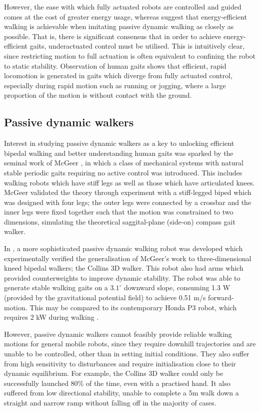 However, the ease with which fully actuated robots are controlled and guided comes at the cost of greater energy usage, whereas \cite{mcgeer1990passive, asano2007dynamic, byl2008approximate} suggest that energy-efficient walking is achievable when imitating passive dynamic walking as closely as possible. That is, there is significant consensus that in order to achieve energy-efficient gaits, underactuated control must be utilised. This is intuitively clear, since restricting motion to full actuation is often equivalent to confining the robot to static stability. Observation of human gaits shows that efficient, rapid locomotion is generated in gaits which diverge from fully actuated control, especially during rapid motion such as running or jogging, where a large proportion of the motion is without contact with the ground.

\subsection{Passive dynamic walkers}
Interest in studying passive dynamic walkers as a key to unlocking efficient bipedal walking and better understanding human gaits was sparked by the seminal work of McGeer \cite{mcgeer1990passive}, in which a class of mechanical systems with natural stable periodic gaits requiring no active control was introduced. This includes walking robots which have stiff legs as well as those which have articulated knees. McGeer validated the theory through experiment with a stiff-legged biped which was designed with four legs; the outer legs were connected by a crossbar and the inner legs were fixed together such that the motion was constrained to two dimensions, simulating the theoretical saggital-plane (side-on) compass gait walker.

In \cite{collins2001three}, a more sophisticated passive dynamic walking robot was developed which experimentally verified the generalisation of McGeer's work to three-dimensional kneed bipedal walkers; the Collins 3D walker. This robot also had arms which provided counterweights to improve dynamic stability. The robot was able to generate stable walking gaits on a $3.1^{\circ}$ downward slope, consuming 1.3 W (provided by the gravitational potential field) to achieve 0.51 m/s forward-motion. This may be compared to its contemporary Honda P3 robot, which requires 2 kW during walking \cite{collins2001three}.

However, passive dynamic walkers cannot feasibly provide reliable walking motions for general mobile robots, since they require downhill trajectories and are unable to be controlled, other than in setting initial conditions. They also suffer from high sensitivity to disturbances and require initialisation close to their dynamic equilibrium. For example, the Collins 3D walker could only be successfully launched 80\% of the time, even with a practised hand. It also suffered from low directional stability, unable to complete a 5m walk down a straight and narrow ramp without falling off in the majority of cases.

